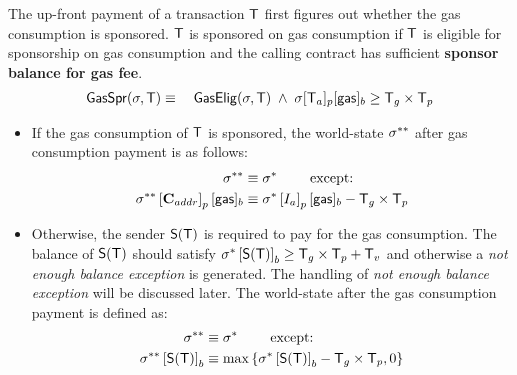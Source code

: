 The up-front payment of a transaction $\textsf{T}$ first figures out whether the gas consumption is sponsored. $\textsf{T}$ is sponsored on gas consumption if $\textsf{T}$ is eligible for sponsorship on gas consumption and the calling contract has sufficient \textbf{sponsor balance for gas fee}. 
\begin{align}
	\mathsf{GasSpr}(\mathbf{\sigma},\textsf{T}) \equiv\quad  \mathsf{GasElig}(\mathbf{\sigma},\textsf{T}) \;\wedge\; \mathbf{\sigma}[\textsf{T}_a]_p[{\sf gas}]_b\ge \textsf{T}_g\times\textsf{T}_p
\end{align}
\begin{itemize}
	\item If the gas consumption of $\textsf{T}$ is sponsored, the world-state $\mathbf{\sigma}^{**}$ after gas consumption payment is as follows: 
	\begin{align}
		\mathbf{\sigma}^{**}  &\equiv \mathbf{\sigma}^* \qquad \mbox{  except:}\\
		\mathbf{\sigma}^{**}\left[\mathbf{C}_{addr}\right]_p[{\sf gas}]_b &\equiv \mathbf{\sigma}^*\left[I_a\right]_p[{\sf gas}]_b-\textsf{T}_g\times\textsf{T}_p
	\end{align} 
	
	\item Otherwise, the sender $\mathsf{S}{\left({\textsf{T}} \right)}$ is required to pay for the gas consumption. 
	The balance of $\mathsf{S}{\left({\textsf{T}} \right)}$ should satisfy $\mathbf{\sigma}^{*} \left[\mathsf{S}{\left({\textsf{T}} \right)}\right]_b \ge \textsf{T}_g\times\textsf{T}_p+\textsf{T}_v$ and otherwise a \emph{not enough balance exception} is generated. The handling of \emph{not enough balance exception} will be discussed later.
	The world-state after the gas consumption payment is defined as: 
	\begin{align}
		\mathbf{\sigma}^{**}  &\equiv \mathbf{\sigma}^* \qquad \mbox{  except:}\\
		\mathbf{\sigma}^{**} \left[\mathsf{S}{\left({\textsf{T}} \right)}\right]_b &\equiv \max{\left \{{\ensuremath{\mathbf{\sigma}}^*\left[\ensuremath{\mathsf{S}{\left({\textsf{T}} \right)}}\right]_b-\textsf{T}_g\times\textsf{T}_p,0} \right \}}
	\end{align}
\end{itemize}




